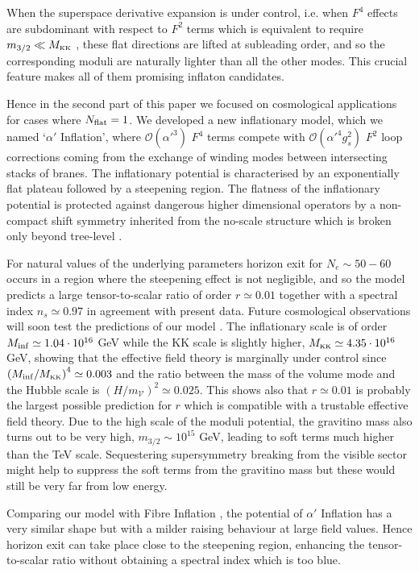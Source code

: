 \documentclass[11pt,a4paper]{article}
\def\KK{{\scriptscriptstyle \rm KK}}
\newcommand\vo{{\mathcal{V}}}
\newcommand{\mc}{\mathcal}
\begin{document}
When the superspace derivative expansion is under control, i.e. when $F^4$ effects are subdominant with respect to $F^2$ terms which is equivalent to require $m_{3/2}\ll M_\KK$ \cite{Cicoli:2013swa}, these flat directions are lifted at subleading order, and so the corresponding moduli are naturally lighter than all the other modes. This crucial feature makes all of them promising inflaton candidates. 

Hence in the second part of this paper we focused on cosmological applications for cases where $N_{\rm flat}=1$. We developed a new inflationary model, which we named `$\alpha'$ Inflation', where $\mc{O}(\alpha'^3)$ $F^4$ terms compete with $\mc{O}(\alpha'^4 g_s^2)$ $F^2$ loop corrections coming from the exchange of winding modes between intersecting stacks of branes. The inflationary potential is characterised by an exponentially flat plateau followed by a steepening region. The flatness of the inflationary potential is protected against dangerous higher dimensional operators by a non-compact shift symmetry inherited from the no-scale structure which is broken only beyond tree-level \cite{Burgess:2014tja,Burgess:2016owb}. 

For natural values of the underlying parameters horizon exit for $N_e\sim 50 - 60$ occurs in a region where the steepening effect is not negligible, and so the model predicts a large tensor-to-scalar ratio of order $r\simeq 0.01$ together with a spectral index $n_s\simeq 0.97$ in agreement with present data. Future cosmological observations will soon test the predictions of our model \cite{rForecasts}. The inflationary scale is of order $M_{\rm inf}\simeq 1.04\cdot 10^{16}$ GeV while the KK scale is slightly higher, $M_\KK\simeq 4.35\cdot 10^{16}$ GeV, showing that the effective field theory is marginally under control since $\left(M_{\rm inf}/M_\KK\right)^4\simeq 0.003$ and the ratio between the mass of the volume mode and the Hubble scale is $(H/m_\vo)^2\simeq 0.025$. This shows also that $r\simeq 0.01$ is probably the largest possible prediction for $r$ which is compatible with a trustable effective field theory. 
Due to the high scale of the moduli potential, the gravitino mass also turns out to be very high, $m_{3/2}\sim 10^{15}$ GeV, leading to soft terms much higher than the TeV scale. Sequestering supersymmetry breaking from the visible sector \cite{Aparicio:2014wxa} might help to suppress the soft terms from the gravitino mass but these would still be very far from low energy.

Comparing our model with Fibre Inflation \cite{Cicoli:2008gp}, the potential of $\alpha'$ Inflation has a very similar shape but with a milder raising behaviour at large field values. Hence horizon exit can take place close to the steepening region, enhancing the tensor-to-scalar ratio without obtaining a spectral index which is too blue. 
\end{document}
